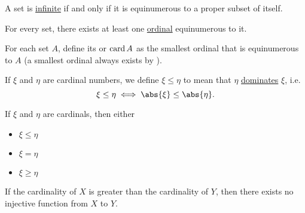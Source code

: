 \begin{proposition}\label{thm:infinite_set_iff_equinumerous_to_proper_subset}
  A set is \hyperref[def:finite_set]{infinite} if and only if it is equinumerous to a proper subset of itself.
\end{proposition}

\medskip

\begin{theorem}\label{thm:equinumerous_ordinal_existence}
  For every set, there exists at least one \hyperref[def:ordinal]{ordinal} equinumerous to it.
\end{theorem}

\medskip

\begin{definition}\label{def:cardinal}
  For each set \( A \), define its  or  \( \operatorname{card} A \) as the smallest ordinal that is equinumerous to \( A \) (a smallest ordinal always exists by ).

  If \( \xi \) and \( \eta \) are cardinal numbers, we define \( \xi \leq \eta \) to mean that \( \eta \) \hyperref[def:set_domination]{dominates} \( \xi \), i.e.
  \begin{equation*}
    \xi \leq \eta \iff \abs{\xi} \leq \abs{\eta}.
  \end{equation*}
\end{definition}

\begin{theorem}\label{thm:cardinal_trichotomy}
  If \( \xi \) and \( \eta \) are cardinals, then either
  \begin{itemize}
    \item \( \xi \leq \eta \)
    \item \( \xi = \eta \)
    \item \( \xi \geq \eta \)
  \end{itemize}
\end{theorem}

\begin{corollary}\label{def:pigeonhole_principle}
  If the cardinality of \( X \) is greater than the cardinality of \( Y \), then there exists no injective function from \( X \) to \( Y \).
\end{corollary}


